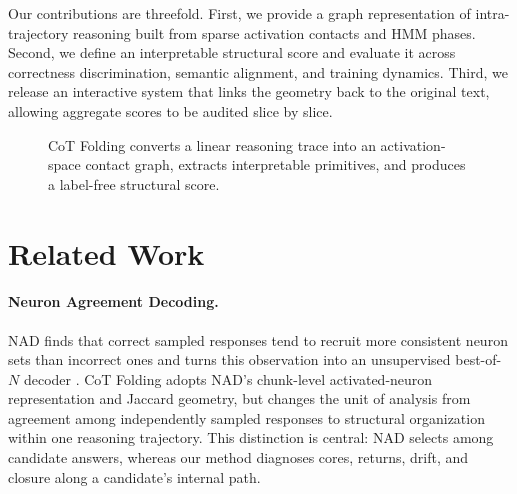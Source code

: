 \documentclass{article}
\begin{document}
Our contributions are threefold. First, we provide a graph representation of intra-trajectory reasoning built from sparse activation contacts and HMM phases. Second, we define an interpretable structural score and evaluate it across correctness discrimination, semantic alignment, and training dynamics. Third, we release an interactive system that links the geometry back to the original text, allowing aggregate scores to be audited slice by slice.

\begin{figure}[t]
\centering
{}
\caption{CoT Folding converts a linear reasoning trace into an activation-space contact graph, extracts interpretable primitives, and produces a label-free structural score.}
\label{fig:pipeline}
\end{figure}

\section{Related Work}

\paragraph{Neuron Agreement Decoding.}
NAD finds that correct sampled responses tend to recruit more consistent neuron sets than incorrect ones and turns this observation into an unsupervised best-of-$N$ decoder \citep{chen2025nad}. CoT Folding adopts NAD's chunk-level activated-neuron representation and Jaccard geometry, but changes the unit of analysis from agreement among independently sampled responses to structural organization within one reasoning trajectory. This distinction is central: NAD selects among candidate answers, whereas our method diagnoses cores, returns, drift, and closure along a candidate's internal path.
\end{document}
